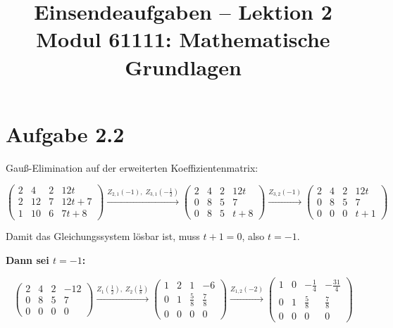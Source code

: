 \documentclass[a4paper,12pt]{article}
\title{Einsendeaufgaben -- Lektion 2\\[0.5em]
\large Modul 61111: Mathematische Grundlagen}
\author{}
\date{}
\begin{document}
\maketitle

\section*{Aufgabe 2.2}

Gauß-Elimination auf der erweiterten Koeffizientenmatrix:

\[
\left(\begin{array}{ccc|c}
2 & 4 & 2 & 12t \\
2 & 12 & 7 & 12t+7 \\
1 & 10 & 6 & 7t+8
\end{array}\right)
\xrightarrow{Z_{2,1}(-1),\; Z_{3,1}\!\left(-\tfrac{1}{2}\right)}
\left(\begin{array}{ccc|c}
2 & 4 & 2 & 12t \\
0 & 8 & 5 & 7 \\
0 & 8 & 5 & t+8
\end{array}\right)
\xrightarrow{Z_{3,2}(-1)}
\left(\begin{array}{ccc|c}
2 & 4 & 2 & 12t \\
0 & 8 & 5 & 7 \\
0 & 0 & 0 & t+1
\end{array}\right)
\]

Damit das Gleichungssystem lösbar ist, muss $t + 1 = 0$, also $t = -1$.

\bigskip
\noindent\textbf{Dann sei $t = -1$:}

\[
\left(\begin{array}{ccc|c}
2 & 4 & 2 & -12 \\
0 & 8 & 5 & 7 \\
0 & 0 & 0 & 0
\end{array}\right)
\xrightarrow{Z_1\!\left(\tfrac{1}{2}\right),\; Z_2\!\left(\tfrac{1}{8}\right)}
\left(\begin{array}{ccc|c}
1 & 2 & 1 & -6 \\
0 & 1 & \tfrac{5}{8} & \tfrac{7}{8} \\
0 & 0 & 0 & 0
\end{array}\right)
\xrightarrow{Z_{1,2}(-2)}
\left(\begin{array}{ccc|c}
1 & 0 & -\tfrac{1}{4} & -\tfrac{31}{4} \\
0 & 1 & \tfrac{5}{8} & \tfrac{7}{8} \\
0 & 0 & 0 & 0
\end{array}\right)
\]
\end{document}
